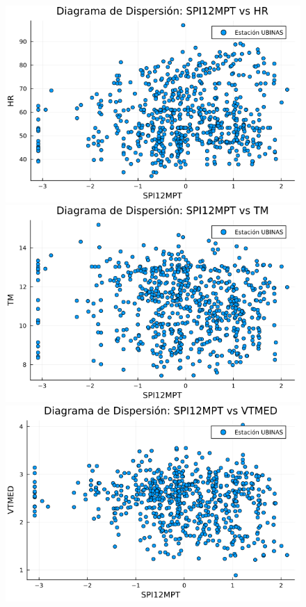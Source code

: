 \begin{figure}[htbp]
\begin{minipage}{0.32\textwidth}
    \centering
    \includegraphics[width=\linewidth]{Capitulos/Scaterplot/UBINAS_SPI12MPT_vs_HR.png}
\end{minipage}\hfill
\begin{minipage}{0.32\textwidth}
    \centering
    \includegraphics[width=\linewidth]{Capitulos/Scaterplot/UBINAS_SPI12MPT_vs_TM.png}
\end{minipage}\hfill
\begin{minipage}{0.32\textwidth}
    \centering
    \includegraphics[width=\linewidth]{Capitulos/Scaterplot/UBINAS_SPI12MPT_vs_VTMED.png}
\end{minipage}


\end{figure}
